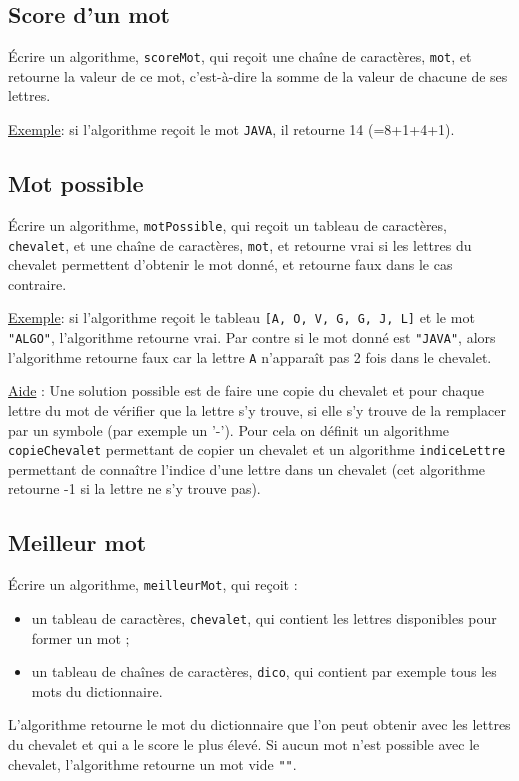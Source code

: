 		\subsection*{Score d'un mot}
			
			\'Ecrire un algorithme, \texttt{scoreMot}, 
			qui reçoit une chaîne de caractères, 
			\texttt{mot}, et retourne la valeur de ce mot, c'est-à-dire la somme de la valeur de chacune de ses lettres.
	
			\underline{Exemple}: si l'algorithme reçoit le mot \texttt{JAVA}, il retourne 14 (=8+1+4+1).
	
		\subsection*{Mot possible}
	
			\'Ecrire un algorithme, \texttt{motPossible}, qui reçoit un tableau de caractères, 
			\texttt{chevalet}, et une chaîne de caractères, 
			\texttt{mot}, et retourne vrai si les lettres du chevalet permettent d'obtenir le mot donné, et retourne faux dans le cas contraire. 
	
	
			\underline{Exemple}: si l'algorithme reçoit le tableau \texttt{[A, O, V, G, G, J, L]} 
			et le mot \texttt{"ALGO"}, l'algorithme retourne vrai. 
			Par contre si le mot donné est \texttt{"JAVA"}, 
			alors l'algorithme retourne faux car la lettre \texttt{A} n'apparaît pas 2 fois dans le chevalet.
	
	
			\underline{Aide} : Une solution possible est de faire une copie du chevalet 
			et pour chaque lettre du mot de vérifier que la lettre s'y trouve, 
			si elle s'y trouve de la remplacer par un symbole (par exemple un '-').
			Pour cela on définit un algorithme \texttt{copieChevalet} 
			permettant de copier un chevalet et un algorithme \texttt{indiceLettre} 
			permettant de connaître l'indice d'une lettre dans un chevalet 
			(cet algorithme retourne -1 si la lettre ne s'y trouve pas). 
	
		\subsection*{Meilleur mot}
	
			\'Ecrire un algorithme, \texttt{meilleurMot}, qui reçoit :
			\begin{itemize}
			\item un tableau de caractères, \texttt{chevalet}, qui contient les lettres disponibles pour former un mot ;
			\item un tableau de chaînes de caractères, \texttt{dico}, qui contient par exemple tous les mots du dictionnaire.
			\end{itemize}
			L'algorithme retourne le mot du dictionnaire que l'on peut obtenir avec les lettres du chevalet 
			et qui a le score le plus élevé. 
			Si aucun mot n'est possible avec le chevalet, l'algorithme retourne un mot vide \texttt{""}.
	
